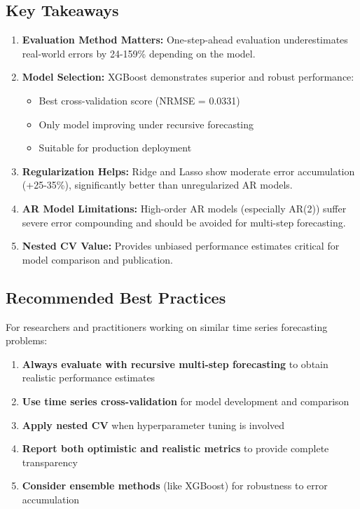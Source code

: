 \documentclass[12pt,a4paper]{article}
\begin{document}
\subsection{Key Takeaways}

\begin{enumerate}
    \item \textbf{Evaluation Method Matters:} One-step-ahead evaluation underestimates real-world errors by 24-159\% depending on the model.
    
    \item \textbf{Model Selection:} XGBoost demonstrates superior and robust performance:
    \begin{itemize}
        \item Best cross-validation score (NRMSE = 0.0331)
        \item Only model improving under recursive forecasting
        \item Suitable for production deployment
    \end{itemize}
    
    \item \textbf{Regularization Helps:} Ridge and Lasso show moderate error accumulation (+25-35\%), significantly better than unregularized AR models.
    
    \item \textbf{AR Model Limitations:} High-order AR models (especially AR(2)) suffer severe error compounding and should be avoided for multi-step forecasting.
    
    \item \textbf{Nested CV Value:} Provides unbiased performance estimates critical for model comparison and publication.
\end{enumerate}

\subsection{Recommended Best Practices}

For researchers and practitioners working on similar time series forecasting problems:

\begin{enumerate}
    \item \textbf{Always evaluate with recursive multi-step forecasting} to obtain realistic performance estimates
    \item \textbf{Use time series cross-validation} for model development and comparison
    \item \textbf{Apply nested CV} when hyperparameter tuning is involved
    \item \textbf{Report both optimistic and realistic metrics} to provide complete transparency
    \item \textbf{Consider ensemble methods} (like XGBoost) for robustness to error accumulation
\end{enumerate}
\end{document}
